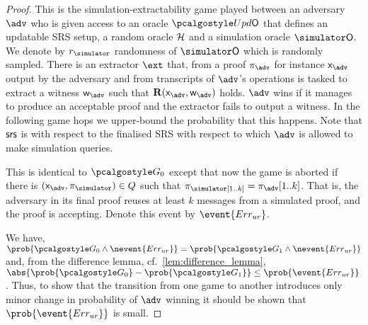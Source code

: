 \begin{proof}		

   This is the simulation-extractability game played between an adversary
  $\advse$ who is given access to an oracle $\initU$ that defines an updatable SRS
  setup, a random oracle $\mathcal{H}$ and a simulation oracle $\simO$. We denote by $r_\simulator$
  randomness of $\simO$ which is randomly sampled. There is an extractor $\ext$ that, from a proof
  $\zkproof_{\advse}$ for instance $\inp_{\advse}$ output by the adversary and from
  transcripts of $\advse$'s operations  is tasked to extract a witness $\wit_{\advse}$ such that
  $\REL(\inp_{\advse}, \wit_{\advse})$ holds. $\advse$ wins if it manages to produce
  an acceptable proof and the extractor fails to output a witness. In the following
  game hops we upper-bound the probability that this happens. Note that $\mathsf{srs}$ is
  with respect to the finalised SRS with respect to which $\adv$ is allowed to make
  simulation queries.

   This is identical to $\game{0}$ except that now the game is aborted
  if there is $(\inp_\advse, \zkproof_{\simulator}) \in Q$ such that $\zkproof_\simulator[1..k] = \zkproof_{\advse}[1..k]$. That is, the adversary in its final proof
  reuses at least $k$ messages from a simulated proof, and the proof is accepting.
  Denote this event by $\event{\errur}$.

    We have, \( \prob{\game{0} \land
  	\nevent{\errur}} = \prob{\game{1} \land \nevent{\errur}} \) and, from the
  difference lemma, cf.~\cref{lem:difference_lemma},
  $ \abs{\prob{\game{0}} - \prob{\game{1}}} \leq \prob{\event{\errur}}\,$.
  Thus, to show that the transition from one game to another introduces only
  minor change in probability of $\adv$ winning it should be shown that
  $\prob{\event{\errur}}$ is small.
  

\end{proof}

